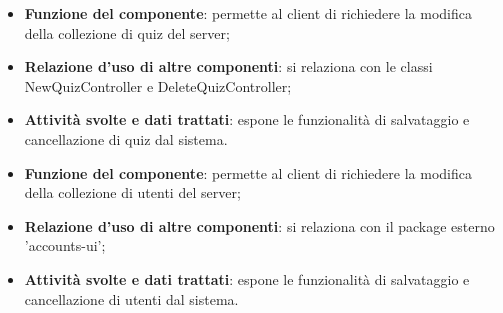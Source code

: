 \begin{itemize}
	\item\textbf{Funzione del componente}: permette al client di richiedere la modifica della collezione di quiz del server;
	\item\textbf{Relazione d'uso di altre componenti}: si relaziona con le classi NewQuizController e DeleteQuizController;
	\item\textbf{Attività svolte e dati trattati}: espone le funzionalità di salvataggio e cancellazione di quiz dal sistema.
\end{itemize}

\begin{itemize}
	\item\textbf{Funzione del componente}: permette al client di richiedere la modifica della collezione di utenti del server;
	\item\textbf{Relazione d'uso di altre componenti}:  si relaziona con il package esterno 'accounts-ui';
	\item\textbf{Attività svolte e dati trattati}: espone le funzionalità di salvataggio e cancellazione di utenti dal sistema.
\end{itemize}
\newpage			

